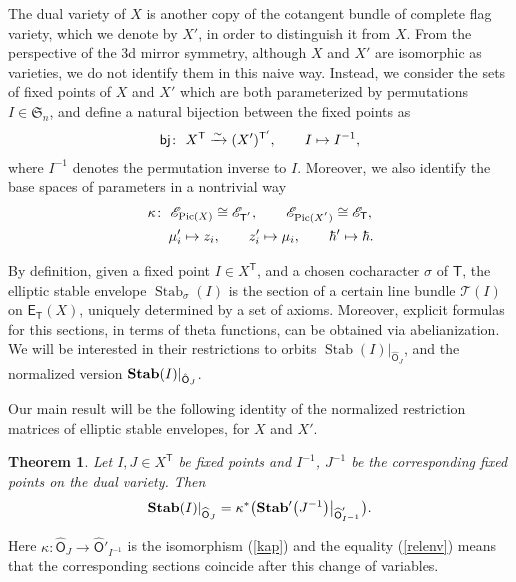 \documentclass[10pt,a4paper]{amsart}
\DeclareMathOperator\Stab{Stab}
\newcommand{\bT}{\mathsf{T}}
\newcommand{\Or}{\textsf{O}}
\newcommand{\cE}{\mathscr{E}}
\numberwithin{equation}{section}
\newtheorem{Theorem}{Theorem}[section]
\begin{document}
The dual variety of $X$ is another copy of the cotangent bundle of complete flag variety, which we denote by $X'$, in order to distinguish it from $X$. From the perspective of the 3d mirror symmetry, although $X$ and $X'$ are isomorphic as varieties, we do not identify them in this naive way. Instead, we consider the sets of fixed points of $X$ and $X'$ which are both parameterized by permutations $I \in \mathfrak{S}_n$, and define a natural bijection between the fixed points as
\begin{gather*}
{\sf bj}\colon \ X^\bT \xrightarrow{\sim} (X')^{\bT'}, \qquad I \mapsto I^{-1},
\end{gather*}
where $I^{-1}$ denotes the permutation inverse to $I$. Moreover, we also identify the base spaces of parameters in a nontrivial way
\begin{gather} \label{kap}
\kappa\colon \ \cE_{{\rm Pic}(X)}\cong \cE_{\bT^{'}}, \qquad \cE_{{\rm Pic}(X^{'})}\cong \cE_{\bT},
\\
\hphantom{\kappa\colon}{} \ \mu'_i \mapsto z_i, \qquad z'_i \mapsto \mu_i, \qquad \hbar' \mapsto \hbar.\nonumber
\end{gather}

By definition, given a fixed point $I\in X^\bT$, and a chosen cocharacter $\sigma$ of $\bT$, the elliptic stable envelope $\Stab_\sigma (I)$ is the section of a certain line bundle $\mathcal{T} (I)$ on $\textsf{E}_\bT (X)$, uniquely determined by a set of axioms. Moreover, explicit formulas for this sections, in terms of theta functions, can be obtained via abelianization. We will be interested in their restrictions to orbits $\Stab (I)|_{\hat{\Or}_{J}}$, and the normalized version ${\bf Stab}(I)|_{\hat{\Or}_{J}}$.

Our main result will be the following identity of the normalized restriction matrices of elliptic stable envelopes, for $X$ and $X'$.

\begin{Theorem} \label{introthm} Let $I,J \in X^{\bT}$ be fixed points and $I^{-1}$, $J^{-1}$ be the corresponding fixed points on the dual variety. Then
 \begin{gather} \label{relenv}
 {\bf Stab}(I)|_{\widehat{\Or}_{J}}=\kappa^{*}\big( {\bf Stab}'\big(J^{-1}\big)\big|_{\widehat{\Or}'_{I^{-1}}}\big).
 \end{gather}
\end{Theorem}
Here $\kappa\colon \widehat{\Or}_{J} \rightarrow \widehat{\Or}'_{I^{-1}}$ is the isomorphism (\ref{kap}) and the equality (\ref{relenv}) means that the corresponding sections coincide after this change of variables.
\end{document}
